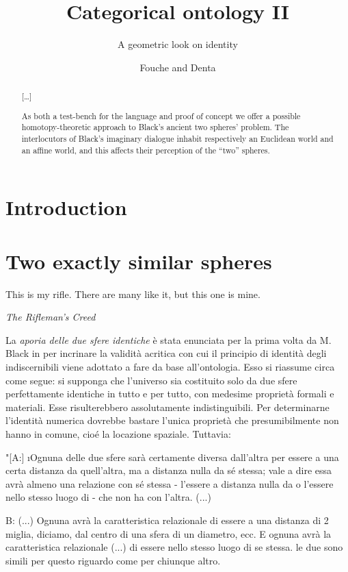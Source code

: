 \documentclass{amsart}
\author{Fouche and Denta}
\title{Categorical ontology II}
\subtitle{A geometric look on identity}
\begin{document}
\maketitle
\begin{abstract}
  [\dots]

  As both a test-bench for the language and proof of concept we offer a possible homotopy-theoretic approach to Black's ancient two spheres' problem. The interlocutors of Black's imaginary dialogue inhabit respectively an Euclidean world and an affine world, and this affects their perception of the ``two'' spheres.
\end{abstract}
\section{Introduction}
\section{Two exactly similar spheres}
\epigraph{This is my rifle. There are many like it, but this one is mine.}{\emph{The Rifleman's Creed}}
La \emph{aporia delle due sfere identiche} è stata enunciata per la prima volta da M. Black in \cite{} per incrinare la validità acritica con cui il principio di identità degli indiscernibili viene adottato a fare da base all'ontologia. Esso si riassume circa come segue: si supponga che l'universo sia costituito solo da due sfere perfettamente identiche in tutto e per tutto, con medesime proprietà formali e materiali. Esse risulterebbero assolutamente indistinguibili. Per determinarne l'identità numerica dovrebbe bastare l'unica proprietà che presumibilmente non hanno in comune, cioé la locazione spaziale. Tuttavia:\par
"[A:] \i Ognuna delle due sfere sarà certamente diversa dall'altra per essere a una certa distanza da quell'altra, ma a distanza nulla da sé stessa; vale a dire essa avrà almeno una relazione con sé stessa - l'essere a distanza nulla da o l'essere nello stesso luogo di - che non ha con l'altra. (...)   \par
B: (...) Ognuna avrà la caratteristica relazionale di essere a una distanza di 2 miglia, diciamo, dal centro di una sfera di un diametro, ecc. E ognuna avrà la caratteristica relazionale (...) di essere nello stesso luogo di se stessa. le due sono simili per questo riguardo come per chiunque altro. \par
\end{document}
